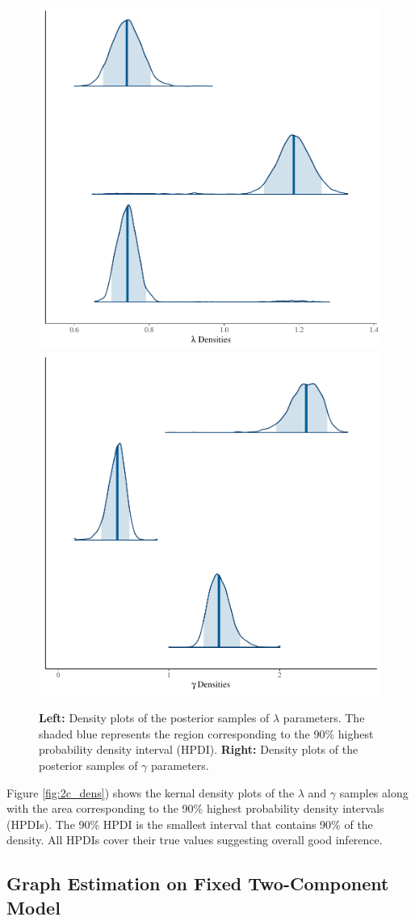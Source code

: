 \documentclass[11pt,a4paper]{article}
\numberwithin{equation}{section}
\begin{document}
\begin{figure}
\includegraphics[width=0.47\linewidth]{thesis_draft_files/figure-latex/unnamed-chunk-7-1} \includegraphics[width=0.47\linewidth]{thesis_draft_files/figure-latex/unnamed-chunk-7-2} \caption{\label{fig:2c_dens}\textbf{Left:} Density plots of the posterior samples of $\lambda$ parameters. The shaded blue represents the region corresponding to the 90\% highest probability density interval (HPDI). \textbf{Right:} Density plots of the posterior samples of $\gamma$ parameters. }\label{fig:unnamed-chunk-7} 
\end{figure}

Figure \ref{fig:2c_dens}) shows the kernal density plots of the
\(\lambda\) and \(\gamma\) samples along with the area corresponding to
the 90\% highest probability density intervals (HPDIs). The 90\% HPDI is
the smallest interval that contains 90\% of the density. All HPDIs cover
their true values suggesting overall good inference.

\hypertarget{graph-estimation-on-fixed-two-component-model}{%
\subsection{Graph Estimation on Fixed Two-Component
Model}\label{graph-estimation-on-fixed-two-component-model}}
\end{document}
